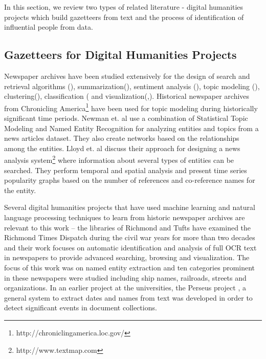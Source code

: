 In this section, we review two types of related literature - digital humanities projects which build gazetteers from text and the process of identification of influential people from data.

\subsection{Gazetteers for Digital Humanities Projects}
Newspaper archives have been studied extensively for the design of search and retrieval algorithms (\cite{Shahaf_11, Gabrilovich_04a, Alonso_10, Khurdiya_11}), summarization(\cite{McKeown95, Otterbacher06, Radev97, Radev01, Radev05}), sentiment analysis (\cite{balahur2009rethinking, godbole2007large, li2014sentiment}), topic modeling (\cite{Masand_92, Nallapati_04a, Radev99c, au2011studying, lee2010topic}), clustering(\cite{dutta2011learning}), classification (\cite{dutta2012using} and visualization(\cite{torget2011mapping},\cite{southall2014pastplace}).
Historical newspaper archives from Chronicling America\footnote{http://chroniclingamerica.loc.gov/} have been used for topic modeling during historically significant time periods\cite{yang2011topic}. Newman et. al\cite{newman2006analyzing} use a combination of Statistical Topic Modeling and Named Entity Recognition for analyzing entities and topics from a news articles dataset. They also create networks based on the relationships among the entities.
Lloyd et. al \cite{lloyd2005lydia} discuss their approach for designing a news analysis system\footnote{http://www.textmap.com} where information about several types of entities can be searched. They perform temporal and spatial analysis and present time series popularity graphs based on the number of references and co-reference names for the entity. %

Several digital humanities projects that have used machine learning and natural language processing techniques to learn from historic newspaper archives are relevant to this work -- the libraries of Richmond and Tufts have examined the Richmond Times Dispatch during the civil war years for more than two decades and their work focuses on automatic identification and analysis of full OCR text in newspapers to provide advanced searching, browsing and visualization\cite{crane2006challenge}. The focus of this work was on named entity extraction and ten categories prominent in these newspapers were studied including ship names, railroads, streets and organizations. In an earlier project at the universities, the Perseus project \cite{smith2002detectinga, smith2002detectingb, smith2001disambiguating}, a general system to extract dates and names from text was developed in order to detect significant events in document collections. 

